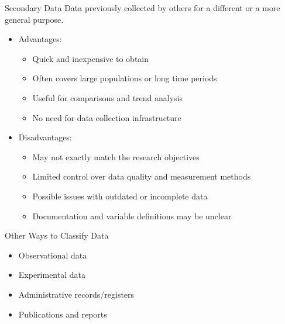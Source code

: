 \documentclass[12pt, aspectratio=169]{beamer}
\begin{document}
	\begin{frame}{Secondary Data}
		Data previously collected by others for a different or a more general purpose.
		\begin{itemize}
			\item Advantages:
			\begin{itemize}
				\item Quick and inexpensive to obtain
				\item Often covers large populations or long time periods
				\item Useful for comparisons and trend analysis
				\item No need for data collection infrastructure
			\end{itemize}
			\item Disadvantages:
			\begin{itemize}
				\item May not exactly match the research objectives
				\item Limited control over data quality and measurement methods
				\item Possible issues with outdated or incomplete data
				\item Documentation and variable definitions may be unclear
			\end{itemize}
		\end{itemize}
	\end{frame}


	\begin{frame}{Other Ways to Classify Data}
		\begin{itemize}
			\item Observational data
			\item Experimental data
			\item Administrative records/registers
			\item Publications and reports
		\end{itemize}
	\end{frame}
\end{document}
